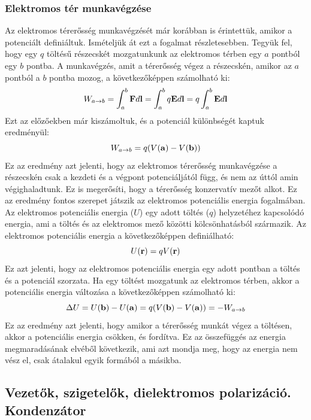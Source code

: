 \documentclass[a4paper,12pt]{article}
\begin{document}
\subsubsection{Elektromos tér munkavégzése}
Az elektromos térerősség munkavégzését már korábban is érintettük, amikor a potenciált definiáltuk. Ismételjük át ezt a fogalmat részletesebben. Tegyük fel, hogy egy $q$ töltésű részecskét mozgatunkunk az elektromos térben egy $a$ pontból egy $b$ pontba. A munkavégzés, amit a térerősség végez a részecskén,
amikor az $a$ pontból a $b$ pontba mozog, a következőképpen számolható ki:
\begin{equation}
    W_{a \to b} = \int_{a}^{b} \bold{F} d\bold{l} = \int_{a}^{b} q \bold{E} d\bold{l} = q \int_{a}^{b} \bold{E} d\bold{l}
\end{equation}
Ezt az előzőekben már kiszámoltuk, és a potenciál különbségét kaptuk eredményül:
\begin{equation}
    W_{a \to b} = q (V(\bold{a}) - V(\bold{b}))
\end{equation}
Ez az eredmény azt jelenti, hogy az elektromos térerősség munkavégzése a részecskén csak a kezdeti és a végpont potenciáljától függ, és nem az úttól amin végighaladtunk. Ez is megerősíti, hogy a térerősség konzervatív mezőt alkot.
\newline
\newline
Ez az eredmény fontos szerepet játszik az elektromos potenciális energia fogalmában. Az elektromos potenciális energia ($U$) egy adott töltés ($q$) helyzetéhez kapcsolódó energia, ami a töltés és az elektromos mező közötti kölcsönhatásból származik. Az elektromos potenciális energia a következőképpen definiálható:
\begin{equation}
    U(\bold{r}) = q V(\bold{r})
\end{equation}
Ez azt jelenti, hogy az elektromos potenciális energia egy adott pontban a töltés és a potenciál szorzata. Ha egy töltést mozgatunk az elektromos térben, akkor a potenciális energia változása a következőképpen számolható ki:
\begin{equation}
    \Delta U = U(\bold{b}) - U(\bold{a}) = q (V(\bold{b}) - V(\bold{a})) = - W_{a \to b}
\end{equation}
Ez az eredmény azt jelenti, hogy amikor a térerősség munkát végez a töltésen, akkor a potenciális energia csökken, és fordítva. Ez az összefüggés az energia megmaradásának elvéből következik, ami azt mondja meg, hogy az energia nem vész el, csak átalakul egyik formából a másikba.

\subsection{Vezetők, szigetelők, dielektromos polarizáció. Kondenzátor}
\end{document}

